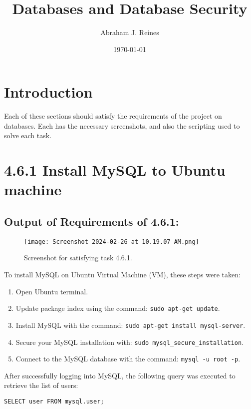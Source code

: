 \documentclass{article}
\title{Databases and Database Security}
\author{Abraham J. Reines}
\date{\today}
\begin{document}
\maketitle

\section*{Introduction}

Each of these sections should satisfy the requirements of the project on databases. Each has the necessary screenshots, and also the scripting used to solve each task.

\section*{4.6.1 Install MySQL to Ubuntu machine}

\subsection*{Output of Requirements of 4.6.1:}
\begin{figure}[H]
    \centering
    \texttt{[image: Screenshot 2024-02-26 at 10.19.07 AM.png]}
    \caption{Screenshot for satisfying task 4.6.1.}
\end{figure}


To install MySQL on Ubuntu Virtual Machine (VM), these steps were taken:

\begin{enumerate}
    \item Open Ubuntu terminal.
    \item Update package index using the command: \texttt{sudo apt-get update}.
    \item Install MySQL with the command: \texttt{sudo apt-get install mysql-server}.
    \item Secure your MySQL installation with: \texttt{sudo mysql\_secure\_installation}.
    \item Connect to the MySQL database with the command: \texttt{mysql -u root -p}.
\end{enumerate}

After successfully logging into MySQL, the following query was executed to retrieve the list of users:

\begin{verbatim}
SELECT user FROM mysql.user;
\end{verbatim}
\end{document}
